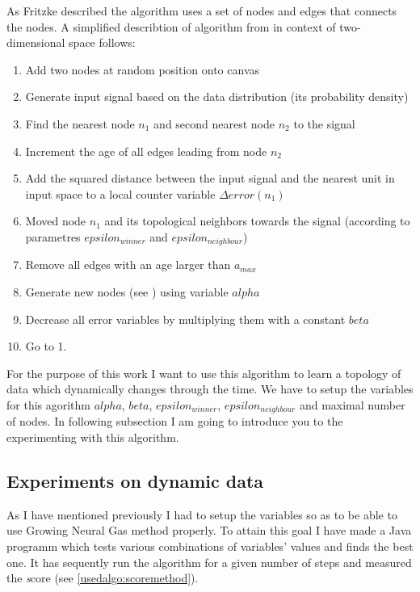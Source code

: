 As Fritzke described the algorithm uses a set of nodes and edges that connects the nodes. A simplified describtion of algorithm from \cite{Fritzke:gng} in context of two-dimensional space follows:

\begin{enumerate}
\item Add two nodes at random position onto canvas
\item Generate input signal based on the data distribution (its probability density)
\item Find the nearest node $n_1$ and second nearest node $n_2$ to the signal
\item Increment the age of all edges leading from node $n_2$
\item Add the squared distance between the input signal and the nearest unit in
input space to a local counter variable $\Delta error(n_{1})$
\item Moved node $n_1$ and its topological neighbors towards the signal (according to parametres $epsilon_{winner}$ and $epsilon_{neighbour}$)
\item Remove all edges with an age larger than $a_{max}$
\item Generate new nodes (see \cite{Fritzke:gng}) using variable $alpha$
\item Decrease all error variables by multiplying them with a constant $beta$
\item Go to 1.
\end{enumerate}

For the purpose of this work I want to use this algorithm to learn a topology of data which dynamically changes through the time. We have to setup the variables for this agorithm $alpha$, $beta$, $epsilon_{winner}$, $epsilon_{neighbour}$ and maximal number of nodes. In following subsection I am going to introduce you to the experimenting with this algorithm.

\subsection{Experiments on dynamic data}

As I have mentioned previously I had to setup the variables so as to be able to use Growing Neural Gas method properly. To attain this goal I have made a Java programm which tests various combinations of variables' values and finds the best one. It has sequently run the algorithm for a given number of steps and measured the {\emph score} (see \ref{usedalgo:scoremethod}).


